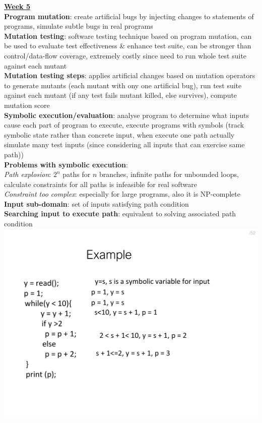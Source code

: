 \documentclass[a4paper]{article}
\begin{document}
\begin{multicols}{3}
        \vfill\null\columnbreak\noindent\underline{\textbf{Week 5}}\\
        \textbf{Program mutation}: create artificial bugs by injecting changes to statements of programs, simulate subtle bugs in real programs\\
        \textbf{Mutation testing}: software testing technique based on program mutation, can be used to evaluate test effectiveness \& enhance test suite, can be stronger than control/data-flow coverage, extremely costly since need to run whole test suite against each mutant\\
        \textbf{Mutation testing steps}: applies artificial changes based on mutation operators to generate mutants (each mutant with ony one artificial bug), run test suite against each mutant (if any test fails mutant killed, else survives), compute mutation score\\
        \textbf{Symbolic execution/evaluation}: analyse program to determine what inputs cause each part of program to execute, execute programs with symbols (track symbolic state rather than concrete input, when execute one path actually simulate many test inputs (since considering all inputs that can exercise same path))\\
        \textbf{Problems with symbolic execution}:\\
        \textit{Path explosion}: $2^n$ paths for $n$ branches, infinite paths for unbounded loops, calculate constraints for all paths is infeasible for real software\\
        \textit{Constraint too complex}: especially for large programs, also it is NP-complete\\
        \textbf{Input sub-domain}: set of inputs satisfying path condition\\
        \textbf{Searching input to execute path}: equivalent to solving associated path condition\\
        \includegraphics[width=\linewidth]{242.pdf}\\

\end{multicols}
\end{document}
